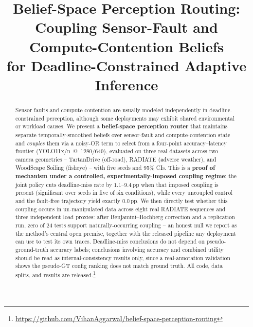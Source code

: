 \documentclass[conference]{IEEEtran}
\begin{document}
\title{Belief-Space Perception Routing:\\
Coupling Sensor-Fault and Compute-Contention Beliefs\\
for Deadline-Constrained Adaptive Inference}

\author{
  \and
}

\maketitle

\begin{abstract}
Sensor faults and compute contention are usually modeled
independently in deadline-constrained perception, although some
deployments may exhibit shared environmental or workload causes. We
present a \textbf{belief-space perception router} that maintains
separate temporally-smoothed beliefs over sensor-fault and
compute-contention state and \emph{couples} them via a noisy-OR term
to select from a four-point accuracy--latency frontier
(YOLO11x/n~@~1280/640), evaluated on three real datasets across two
camera geometries -- TartanDrive (off-road), RADIATE (adverse
weather), and WoodScape Soiling (fisheye) -- with five seeds and 95\%
CIs. This is a \textbf{proof of mechanism under a controlled,
experimentally-imposed coupling regime}: the joint policy cuts
deadline-miss rate by $1.1$--$9.4$\,pp when that imposed coupling is
present (significant over seeds in five of six conditions), while
every uncoupled control and the fault-free trajectory yield exactly
$0.0$\,pp. We then directly test whether this coupling occurs in
un-manipulated data across eight real RADIATE sequences and three
independent load proxies: after Benjamini--Hochberg correction and a
replication run, zero of 24 tests support naturally-occurring
coupling -- an honest null we report as the method's central open
premise, together with the released pipeline any deployment can use
to test its own traces. Deadline-miss
conclusions do not depend on pseudo-ground-truth accuracy labels;
conclusions involving accuracy and combined utility should be read as
internal-consistency results only, since a real-annotation validation
shows the pseudo-GT config ranking does not match ground truth. All
code, data splits, and results are released.\footnote{\url{https://github.com/VihanAggarwal/belief-space-perception-routing}}
\end{abstract}
\end{document}
